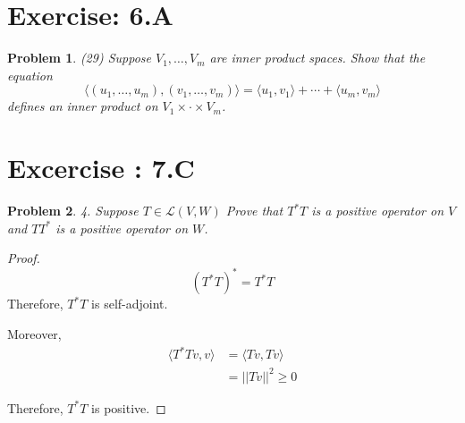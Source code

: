 \documentclass[12pt]{book}
\newtheorem*{problem*}{Problem}
\newcommand{\LL}{\mathcal{L}}
\begin{document}
\section{Exercise: 6.A}
\begin{problem*}
  (29) Suppose $V_1, \ldots, V_m$ are inner product spaces. Show that the equation 
  \[
  \langle(u_1, \ldots, u_m), (v_1, \ldots, v_m) \rangle = \langle u_1, v_1\rangle + \cdots + \langle u_m, v_m\rangle
  \]
  defines an inner product on $V_1 \times \cdot \times V_m$.
\end{problem*}


\section{Excercise : 7.C}

\begin{problem*}
4. Suppose $T \in \LL(V,W)$ Prove that $T^*T$ is a positive operator on $V$ and $TT^*$ is a positive operator on $W$. 
\end{problem*}

\begin{proof}
  \[
  (T^{*}T)^* = T^*T
  \]
  Therefore, $T^{*}T$ is self-adjoint.

  Moreover,
  \begin{align*}
    \langle T^{*}Tv, v \rangle & = \langle Tv, Tv \rangle\\
    & = ||Tv||^2 \ge 0
  \end{align*}

Therefore, $T^{*}T$ is positive. 
\end{proof}


\end{document}
